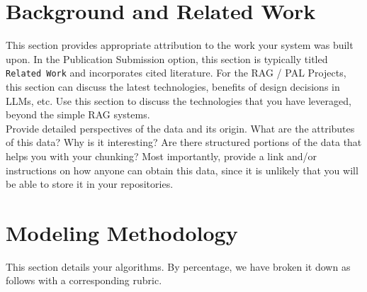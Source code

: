 \documentclass[paper=a4, fontsize=11pt]{scrartcl} %
\begin{document}
\section{Background and Related Work}

This section provides appropriate attribution to the work your system was built upon. In the Publication Submission option, this section is typically titled \verb"Related Work" and incorporates cited literature. For the RAG / PAL Projects, this section can discuss the latest technologies, benefits of design decisions in LLMs, etc. Use this section to discuss the technologies that you have leveraged, beyond the simple RAG systems.  \\


Provide detailed perspectives of the data and its origin. What are the attributes of this data? Why is it interesting? Are there structured portions of the data that helps you with your chunking? Most importantly, provide a link and/or instructions on how anyone can obtain this data, since it is unlikely that you will be able to store it in your repositories.


\section{Modeling Methodology}

This section details your algorithms. By percentage, we have broken it down as follows with a corresponding rubric. 

\end{document}
